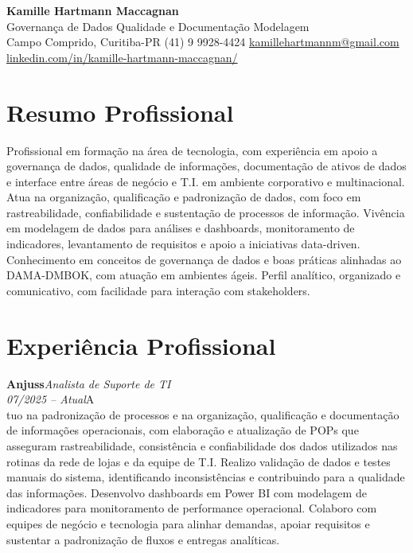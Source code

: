 \documentclass[11pt,a4paper]{article}
\newcommand{\cvrole}[4]{%
  \vspace{4pt}%
  {\bfseries\color{accentcolor}#1}\hfill{\itshape #2}\\[-2pt]%
  {\itshape #3}\hfill #4\\[6pt]%
}
\begin{document}
\begin{center}
  {\fontsize{20}{24}\selectfont\bfseries Kamille Hartmann Maccagnan}\\[8pt]
  {\large Governança de Dados \textbar{} Qualidade e Documentação \textbar{} Modelagem}\\[10pt]
  Campo Comprido, Curitiba-PR \enspace\textbullet\enspace (41) 9 9928-4424 \enspace\textbullet\enspace
  \href{mailto:kamillehartmannm@gmail.com}{kamillehartmannm@gmail.com}\\[3pt]
  \href{https://linkedin.com/in/kamille-hartmann-maccagnan/}{linkedin.com/in/kamille-hartmann-maccagnan/}
\end{center}

\vspace{6pt}

\section{Resumo Profissional}

Profissional em formação na área de tecnologia, com experiência em apoio a governança de dados, qualidade de informações, documentação de ativos de dados e interface entre áreas de negócio e T.I. em ambiente corporativo e multinacional. Atua na organização, qualificação e padronização de dados, com foco em rastreabilidade, confiabilidade e sustentação de processos de informação. Vivência em modelagem de dados para análises e dashboards, monitoramento de indicadores, levantamento de requisitos e apoio a iniciativas data-driven. Conhecimento em conceitos de governança de dados e boas práticas alinhadas ao DAMA-DMBOK, com atuação em ambientes ágeis. Perfil analítico, organizado e comunicativo, com facilidade para interação com stakeholders.

\section{Experiência Profissional}

\cvrole{Anjuss}{Analista de Suporte de TI}{07/2025 -- Atual}

Atuo na padronização de processos e na organização, qualificação e documentação de informações operacionais, com elaboração e atualização de POPs que asseguram rastreabilidade, consistência e confiabilidade dos dados utilizados nas rotinas da rede de lojas e da equipe de T.I. Realizo validação de dados e testes manuais do sistema, identificando inconsistências e contribuindo para a qualidade das informações. Desenvolvo dashboards em Power BI com modelagem de indicadores para monitoramento de performance operacional. Colaboro com equipes de negócio e tecnologia para alinhar demandas, apoiar requisitos e sustentar a padronização de fluxos e entregas analíticas.
\end{document}
